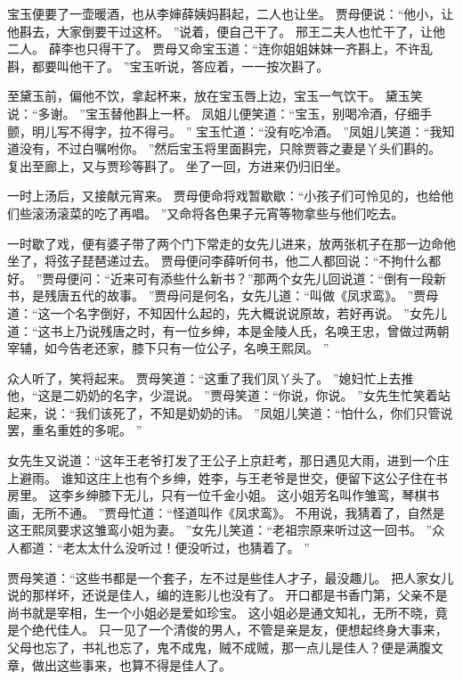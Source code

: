 \par
宝玉便要了一壶暖酒，也从李婶薛姨妈斟起，二人也让坐。
贾母便说：“他小，让他斟去，大家倒要干过这杯。
”说着，便自己干了。
邢王二夫人也忙干了，让他二人。
薛李也只得干了。
贾母又命宝玉道：“连你姐姐妹妹一齐斟上，不许乱斟，都要叫他干了。
”宝玉听说，答应着，一一按次斟了。
\par
至黛玉前，偏他不饮，拿起杯来，放在宝玉唇上边，宝玉一气饮干。
黛玉笑说：“多谢。
”宝玉替他斟上一杯。
凤姐儿便笑道：“宝玉，别喝冷酒，仔细手颤，明儿写不得字，拉不得弓。
”
宝玉忙道：“没有吃冷酒。
”凤姐儿笑道：“我知道没有，不过白嘱咐你。
”然后宝玉将里面斟完，只除贾蓉之妻是丫头们斟的。
复出至廊上，又与贾珍等斟了。
坐了一回，方进来仍归旧坐。
\par
一时上汤后，又接献元宵来。
贾母便命将戏暂歇歇：“小孩子们可怜见的，也给他们些滚汤滚菜的吃了再唱。
”又命将各色果子元宵等物拿些与他们吃去。
\par
一时歇了戏，便有婆子带了两个门下常走的女先儿进来，放两张杌子在那一边命他坐了，将弦子琵琶递过去。
贾母便问李薛听何书，他二人都回说：“不拘什么都好。
”贾母便问：“近来可有添些什么新书？”那两个女先儿回说道：“倒有一段新书，是残唐五代的故事。
”贾母问是何名，女先儿道：“叫做《凤求鸾》。
”贾母道：“这一个名字倒好，不知因什么起的，先大概说说原故，若好再说。
”女先儿道：“这书上乃说残唐之时，有一位乡绅，本是金陵人氏，名唤王忠，曾做过两朝宰辅，如今告老还家，膝下只有一位公子，名唤王熙凤。
”\par
众人听了，笑将起来。
贾母笑道：“这重了我们凤丫头了。
”媳妇忙上去推他，“这是二奶奶的名字，少混说。
”贾母笑道：“你说，你说。
”女先生忙笑着站起来，说：“我们该死了，不知是奶奶的讳。
”凤姐儿笑道：“怕什么，你们只管说罢，重名重姓的多呢。
”\par
女先生又说道：“这年王老爷打发了王公子上京赶考，那日遇见大雨，进到一个庄上避雨。
谁知这庄上也有个乡绅，姓李，与王老爷是世交，便留下这公子住在书房里。
这李乡绅膝下无儿，只有一位千金小姐。
这小姐芳名叫作雏鸾，琴棋书画，无所不通。
”贾母忙道：“怪道叫作《凤求鸾》。
不用说，我猜着了，自然是这王熙凤要求这雏鸾小姐为妻。
”女先儿笑道：“老祖宗原来听过这一回书。
”众人都道：“老太太什么没听过！便没听过，也猜着了。
”\par
贾母笑道：“这些书都是一个套子，左不过是些佳人才子，最没趣儿。
把人家女儿说的那样坏，还说是佳人，编的连影儿也没有了。
开口都是书香门第，父亲不是尚书就是宰相，生一个小姐必是爱如珍宝。
这小姐必是通文知礼，无所不晓，竟是个绝代佳人。
只一见了一个清俊的男人，不管是亲是友，便想起终身大事来，父母也忘了，书礼也忘了，鬼不成鬼，贼不成贼，那一点儿是佳人？便是满腹文章，做出这些事来，也算不得是佳人了。
